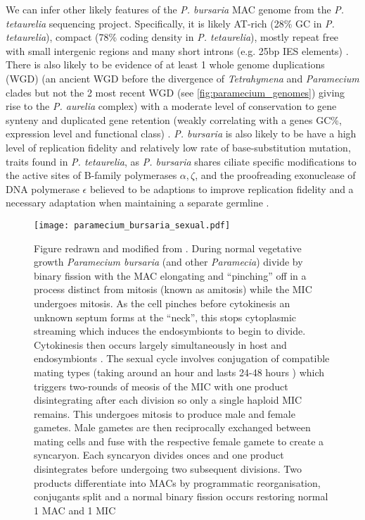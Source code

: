 We can infer other likely features of the \textit{P. bursaria} MAC genome from the \textit{P. tetaurelia} sequencing project.
Specifically, it is likely AT-rich (28\% GC in \textit{P. tetaurelia}), compact (78\% coding density in \textit{P. tetaurelia}),
mostly repeat free with small intergenic regions and many short introns (e.g. 25bp IES elements) \citep{Aury2006}.  
There is also likely to be evidence of at least 1 whole genome duplications (WGD) (an ancient WGD before the divergence of 
\textit{Tetrahymena} and \textit{Paramecium} clades but not the 2 most recent WGD (see \cref{fig:paramecium_genomes}) 
giving rise to the \textit{P. aurelia} complex) with a moderate 
level of conservation to gene synteny and duplicated gene retention 
(weakly correlating with a genes GC\%, expression level and functional class) \citep{Aury2006,McGrath2014}.
\textit{P. bursaria} is also likely to be have a high level of replication fidelity and relatively low rate of base-substitution mutation,
traits found in \textit{P. tetaurelia}, as \textit{P. bursaria} shares ciliate specific modifications to the active sites
of B-family polymerases \(\alpha, \zeta\), and the proofreading exonuclease of DNA polymerase \(\epsilon\) believed to be adaptions to
improve replication fidelity and a necessary adaptation when maintaining a separate germline \citep{Sung2012}.

\begin{figure}[h!]
    \centering
    \caption[Life Cycle of \textit{P. bursaria}]{
        Figure redrawn and modified from \citep{Duret2008}.
        During normal vegetative growth \textit{Paramecium bursaria} (and other \textit{Paramecia}) divide by binary fission with the MAC
        elongating and ``pinching'' off in a process distinct from mitosis (known as amitosis) while the MIC undergoes mitosis.
        As the cell pinches before cytokinesis an unknown septum forms at the ``neck'', this stops cytoplasmic streaming which induces
        the endosymbionts to begin to divide. Cytokinesis then occurs largely simultaneously in host and endosymbionts \citep{Kadono2004,Takahashi2007}.
        The sexual cycle involves conjugation of compatible mating types (taking around an hour and lasts 24-48 hours \citep{Jennings1939}) 
        which triggers two-rounds of meosis of the MIC with
        one product disintegrating after each division so only a single haploid MIC remains. This undergoes mitosis to produce male and
        female gametes. Male gametes are then reciprocally exchanged between mating cells and fuse with the respective female gamete to 
        create a syncaryon. Each syncaryon divides onces and one product disintegrates before undergoing two subsequent divisions.
        Two products differentiate into MACs by programmatic reorganisation, conjugants split and a normal binary fission occurs 
    restoring normal 1 MAC and 1 MIC \citep{Siegel1963} }%
    \texttt{[image: paramecium\_bursaria\_sexual.pdf]}
    \label{fig:pb_sex} 
\end{figure}

